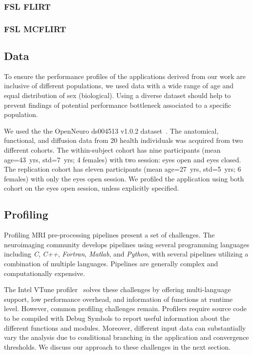 \documentclass[conference]{IEEEtran}
\begin{document}
\subsubsection{FSL FLIRT}


\subsubsection{FSL MCFLIRT}

\subsection{Data}
To ensure the performance profiles of the applications derived from our work are inclusive of different populations, we used data with a wide range of age and equal distribution of sex (biological). Using a diverse dataset should help to prevent findings of potential performance bottleneck associated to a specific population.

We used the the OpenNeuro ds004513 v1.0.2 dataset~\cite{ds004513:1.0.2}. The anatomical, functional, and diffusion data from 20 health individuals was acquired from two different cohorts. The within-subject cohort has nine participants (mean age=43~yrs, std=7~yrs; 4 females) with two session: eyes open and eyes closed. The replication cohort has eleven participants (mean age=27~yrs, std=5~yrs; 6 females) with only the eyes open session. We profiled the application using both cohort on the eyes open session, unless explicitly specified.

\subsection{Profiling}
Profiling MRI pre-processing pipelines present a set of challenges. The neuroimaging community develops pipelines using several programming languages including \textit{C}, \textit{C++}, \textit{Fortran}, \textit{Matlab}, and \textit{Python}, with several pipelines utilizing a combination of multiple languages. Pipelines are generally complex and computationally expensive.

The Intel VTune profiler~\cite{vtune_profiler} solves these challenges by offering multi-language support, low performance overhead, and information of functions at runtime level. However, common profiling challenges remain. Profilers require source code to be compiled with Debug Symbols to report useful information about the different functions and modules. Moreover, different input data can substantially vary the analysis due to conditional branching in the application and convergence thresholds. We discuss our approach to these challenges in the next section.
\end{document}
